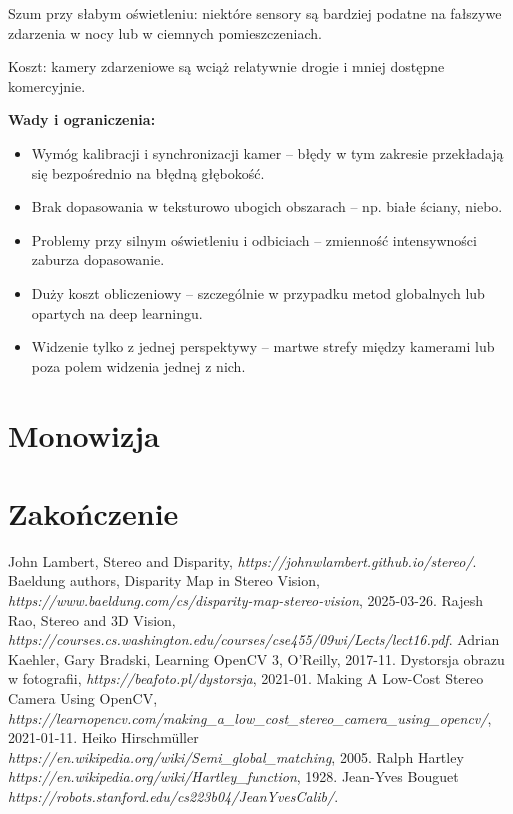 \documentclass[magisterska]{pracadypl}
\begin{document}
Szum przy słabym oświetleniu: niektóre sensory są bardziej podatne na fałszywe zdarzenia w nocy lub w ciemnych pomieszczeniach.

Koszt: kamery zdarzeniowe są wciąż relatywnie drogie i mniej dostępne komercyjnie.

\begin{minipage}[t]{\textwidth}
\textbf{Wady i ograniczenia:}
\begin{itemize}
  \item Wymóg kalibracji i synchronizacji kamer – błędy w tym zakresie przekładają się bezpośrednio na błędną głębokość.

  \item Brak dopasowania w teksturowo ubogich obszarach – np. białe ściany, niebo.

  \item Problemy przy silnym oświetleniu i odbiciach – zmienność intensywności zaburza dopasowanie.

  \item Duży koszt obliczeniowy – szczególnie w przypadku metod globalnych lub opartych na deep learningu.

  \item Widzenie tylko z jednej perspektywy – martwe strefy między kamerami lub poza polem widzenia jednej z nich.
\end{itemize}
\end{minipage}

\chapter{Monowizja}

\chapter{Zakończenie}

\renewcommand{\listfigurename}{Spis rysunków}
\listoffigures

\begin{thebibliography}{7}
\raggedright

 John Lambert, Stereo and Disparity, \textit{https://johnwlambert.github.io/stereo/}.
 Baeldung authors, Disparity Map in Stereo Vision, \textit{https://www.baeldung.com/cs/disparity-map-stereo-vision}, 2025-03-26.
 Rajesh Rao, Stereo and 3D Vision, \textit{https://courses.cs.washington.edu/courses/cse455/09wi/Lects/lect16.pdf}.
 Adrian Kaehler, Gary Bradski, Learning OpenCV 3, O'Reilly, 2017-11.
 Dystorsja obrazu w fotografii, \textit{https://beafoto.pl/dystorsja}, 2021-01.
 Making A Low-Cost Stereo Camera Using OpenCV, \textit{https://learnopencv.com/making\_a\_low\_cost\_stereo\_camera\_using\_opencv/}, 2021-01-11.
 Heiko Hirschmüller \textit{https://en.wikipedia.org/wiki/Semi\_global\_matching}, 2005.
 Ralph Hartley \textit{https://en.wikipedia.org/wiki/Hartley\_function}, 1928.
 Jean-Yves Bouguet \textit{https://robots.stanford.edu/cs223b04/JeanYvesCalib/}.

\end{thebibliography}
\end{document}
